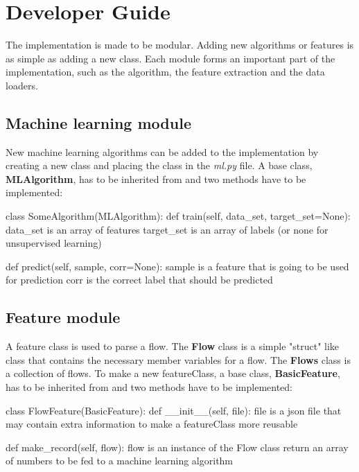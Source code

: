
\chapter{Developer Guide} %
\label{framework}
The implementation is made to be modular. Adding new algorithms or features is as simple as adding a new class. Each module forms an important part of the implementation, such as the algorithm, the feature extraction and the data loaders.

\section{Machine learning module}
New machine learning algorithms can be added to the implementation by creating a new class and placing the class in the \textit{ml.py} file. A base class, \textbf{MLAlgorithm}, has to be inherited from and two methods have to be implemented: \\
\begin{python}
class SomeAlgorithm(MLAlgorithm):
    def train(self, data_set, target_set=None):
        data_set is an array of features
        target_set is an array of labels
            (or none for unsupervised learning)

    def predict(self, sample, corr=None):
        sample is a feature that is going 
            to be used for prediction
        corr is the correct label that 
            should be predicted
\end{python}

\section{Feature module}
A feature class is used to parse a flow. The \textbf{Flow} class is a simple "struct" like class that contains the necessary member variables for a flow. The \textbf{Flows} class is a collection of flows. To make a new featureClass, a base class, \textbf{BasicFeature}, has to be inherited from and two methods have to be implemented:\\

\begin{python}
class FlowFeature(BasicFeature):
    def __init__(self, file):
        file is a json file that may contain extra 
        information to make a featureClass 
        more reusable
        
    def make_record(self, flow):
        flow is an instance of the Flow class
        return an array of numbers to be fed 
            to a machine learning algorithm
\end{python}

